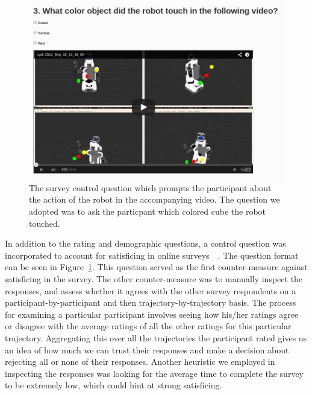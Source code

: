 \documentclass[letterpaper, 10 pt, conference]{ieeeconf}  %
\begin{document}
\begin{figure}
\includegraphics[trim = 0mm 0mm 0mm 0mm, width=\columnwidth]{pictures/amazon_control_question}
\caption{The survey control question which prompts the participant about the action of the robot in the accompanying video. The question we adopted was to ask the particpant which colored cube the robot touched.}
\label{fig:control_question}
\end{figure}

In addition to the rating and demographic questions, a control question was incorporated to account for satisficing in online surveys~\cite{krosnick1991response}~\cite{krosnick1996satisficing}. The question format can be seen in Figure~\ref{fig:control_question}. This question served as the first counter-measure against satisficing in the survey. The other counter-measure was to manually inspect the responses, and assess whether it agrees with the other survey respondents on a participant-by-participant and then trajectory-by-trajectory basis. The process for examining a particular participant involves seeing how his/her ratings agree or disagree with the average ratings of all the other ratings for this particular trajectory. Aggregating this over all the trajectories the participant rated gives us an idea of how much we can trust their responses and make a decision about rejecting all or none of their responses. Another heuristic we employed in inspecting the responses was looking for the average time to complete the survey to be extremely low, which could hint at strong satisficing.
\end{document}
